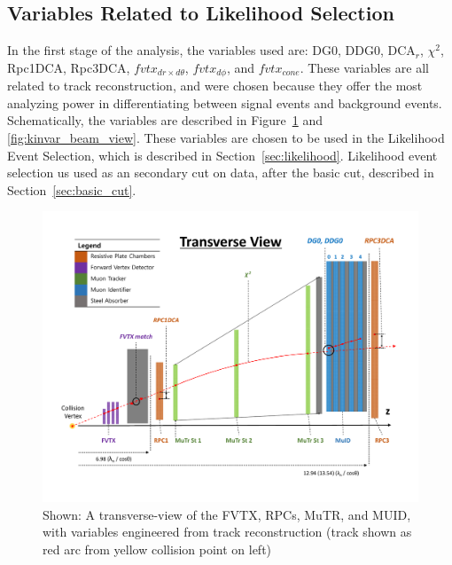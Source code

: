 \subsection{Variables Related to Likelihood Selection}
\label{sec:analysis_variables}

In the first stage of the analysis, the variables used are: DG0, DDG0, DCA$_r$,
$\chi^2$, Rpc1DCA, Rpc3DCA, $fvtx_{dr \times d\theta}$, $fvtx_{d\phi}$, and
$fvtx_{cone}$. These variables are all related to track reconstruction, and were
chosen because they offer the most analyzing power in differentiating between
signal events and background events. Schematically, the variables are described
in Figure~\ref{fig:kinvar_side_view} and \ref{fig:kinvar_beam_view}. These
variables are chosen to be used in the Likelihood Event Selection, which is
described in Section~\ref{sec:likelihood}. Likelihood event selection us used as
an secondary cut on data, after the basic cut, described in
Section~\ref{sec:basic_cut}.

\begin{figure}[ht]
  \centering
  \includegraphics[width=\textwidth]{./figures/kinvar_side_view.pdf}
  \caption{
    Shown: A transverse-view of the FVTX, RPCs, MuTR, and MUID, with
    variables engineered from track reconstruction (track shown as red arc from
    yellow collision point on left)~\cite{Kim2016}
  }
  \label{fig:kinvar_side_view}
\end{figure}
    

